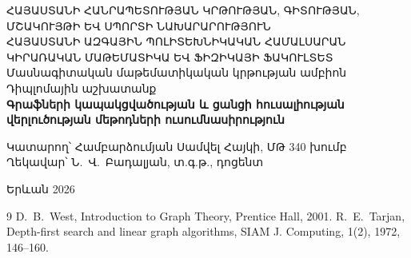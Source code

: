 \documentclass[12pt,a4paper]{extreport}
\theoremstyle{definition}
\begin{document}
\thispagestyle{empty}
\begin{center}
{\small ՀԱՅԱՍՏԱՆԻ ՀԱՆՐԱՊԵՏՈՒԹՅԱՆ ԿՐԹՈՒԹՅԱՆ, ԳԻՏՈՒԹՅԱՆ,\\ՄՇԱԿՈՒՅԹԻ ԵՎ ՍՊՈՐՏԻ ՆԱԽԱՐԱՐՈՒԹՅՈՒՆ}\\[0.3cm]
{\small ՀԱՅԱՍՏԱՆԻ ԱԶԳԱՅԻՆ ՊՈԼԻՏԵԽՆԻԿԱԿԱՆ ՀԱՄԱԼՍԱՐԱՆ}\\[0.2cm]
{\small ԿԻՐԱՌԱԿԱՆ ՄԱԹԵՄԱՏԻԿԱ ԵՎ ՖԻԶԻԿԱՅԻ ՖԱԿՈՒԼՏԵՏ}\\[0.2cm]
{\small Մասնագիտական մաթեմատիկական կրթության ամբիոն}\\
\vspace*{2cm}
{\large Դիպլոմային աշխատանք}\\[1.2cm]
{\Large\bfseries Գրաֆների կապակցվածության և ցանցի հուսալիության\\վերլուծության մեթոդների ուսումնասիրություն}\\[2cm]
\begin{flushright}
Կատարող՝ Համբարձումյան Սամվել Հայկի, ՄԹ 340 խումբ\\[0.4cm]
Ղեկավար՝ Ն.~Վ.~Բադալյան, տ.գ.թ., դոցենտ
\end{flushright}
\end{center}
\vfill
\begin{center}Երևան 2026\end{center}
\clearpage

\tableofcontents
\clearpage








\clearpage
{}
\nocite{*}
\begin{thebibliography}{9}
 D.~B.~West, Introduction to Graph Theory, Prentice Hall, 2001.
 R.~E.~Tarjan, Depth-first search and linear graph algorithms, SIAM J. Computing, 1(2), 1972, 146--160.
\end{thebibliography}
\end{document}
